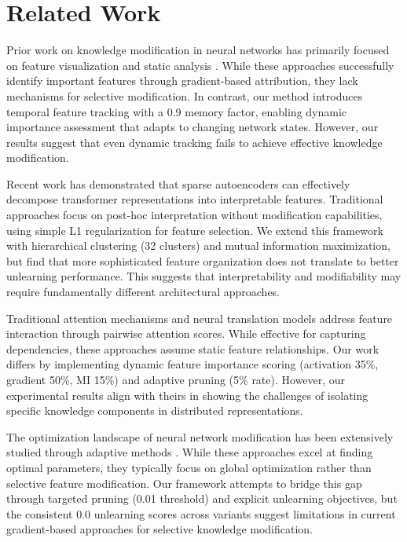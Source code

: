 \documentclass{article} %
\begin{document}
\section{Related Work}
\label{sec:related}

Prior work on knowledge modification in neural networks has primarily focused on feature visualization and static analysis \cite{goodfellow2016deep}. While these approaches successfully identify important features through gradient-based attribution, they lack mechanisms for selective modification. In contrast, our method introduces temporal feature tracking with a 0.9 memory factor, enabling dynamic importance assessment that adapts to changing network states. However, our results suggest that even dynamic tracking fails to achieve effective knowledge modification.

Recent work has demonstrated that sparse autoencoders can effectively decompose transformer representations into interpretable features. Traditional approaches focus on post-hoc interpretation without modification capabilities, using simple L1 regularization for feature selection. We extend this framework with hierarchical clustering (32 clusters) and mutual information maximization, but find that more sophisticated feature organization does not translate to better unlearning performance. This suggests that interpretability and modifiability may require fundamentally different architectural approaches.

Traditional attention mechanisms \cite{vaswani2017attention} and neural translation models \cite{bahdanau2014neural} address feature interaction through pairwise attention scores. While effective for capturing dependencies, these approaches assume static feature relationships. Our work differs by implementing dynamic feature importance scoring (activation 35\%, gradient 50\%, MI 15\%) and adaptive pruning (5\% rate). However, our experimental results align with theirs in showing the challenges of isolating specific knowledge components in distributed representations.

The optimization landscape of neural network modification has been extensively studied through adaptive methods \cite{kingma2014adam}. While these approaches excel at finding optimal parameters, they typically focus on global optimization rather than selective feature modification. Our framework attempts to bridge this gap through targeted pruning (0.01 threshold) and explicit unlearning objectives, but the consistent 0.0 unlearning scores across variants suggest limitations in current gradient-based approaches for selective knowledge modification.
\end{document}
